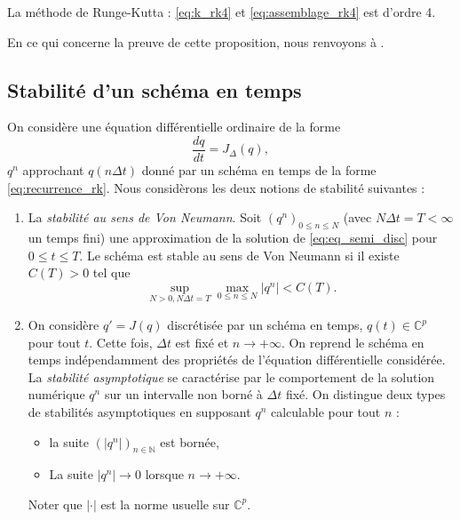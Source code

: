 \begin{proposition}
La méthode de Runge-Kutta : \eqref{eq:k_rk4} et \eqref{eq:assemblage_rk4} est d'ordre 4.
\end{proposition}
En ce qui concerne la preuve de cette proposition, nous renvoyons à \cite{Demailly2016}.


\subsection{Stabilité d'un schéma en temps}

On considère une équation différentielle ordinaire de la forme
\begin{equation}
\dfrac{dq}{dt} = J_{\Delta}(q),
\label{eq:eq_semi_disc}
\end{equation}
$q^n$ approchant $q(n \Delta t)$ donné par un schéma en temps de la forme \eqref{eq:recurrence_rk}. Nous considèrons les deux notions de stabilité suivantes :
\begin{enumerate}
\item La \textit{stabilité au sens de Von Neumann}. Soit $(q^n)_{0 \leq n \leq N}$ (avec $N \Delta t = T < \infty$ un temps fini) une approximation de la solution de \eqref{eq:eq_semi_disc} pour $0 \leq t \leq T$. Le schéma est stable au sens de Von Neumann si il existe $C(T)>0$ tel que
\begin{equation}
\sup_{N>0, N \Delta t = T} \max_{0 \leq n \leq N} |q^n| < C(T).
\end{equation}

\item On considère $q'=J(q)$ discrétisée par un schéma en temps, $q(t) \in \mathbb{C}^p$ pour tout $t$. Cette fois, $\Delta t$ est fixé et $n \rightarrow + \infty$. On reprend le schéma en temps indépendamment des propriétés de l'équation différentielle considérée. La \textit{stabilité asymptotique} se caractérise par le comportement de la solution numérique $q^n$ sur un intervalle non borné à $\Delta t$ fixé. On distingue deux types de stabilités asymptotiques en supposant $q^n$ calculable pour tout $n$ :
\begin{itemize}
\item la suite $(|q^n|)_{n \in \mathbb{N}}$ est bornée,
\item La suite $|q^n| \rightarrow 0$ lorsque $n \rightarrow + \infty$.
\end{itemize}
Noter que $|\cdot|$ est la norme usuelle sur $\mathbb{C}^p$.
\end{enumerate} 

